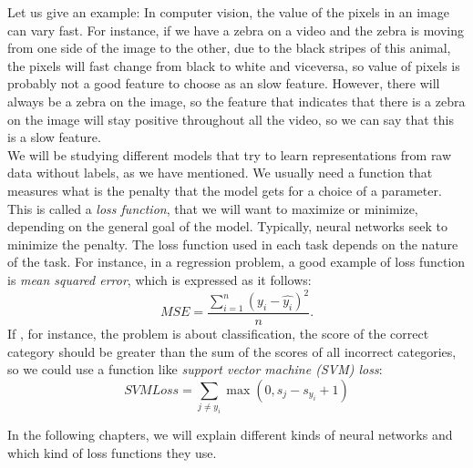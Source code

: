 
Let us give an example: In computer vision, the value of the pixels in an image can vary fast. For instance, if we have a zebra on a video and the zebra is moving from one side of the image to the other, due 
to the black stripes of this animal, the pixels will fast change from black to white and viceversa, so value of pixels is probably not a good feature to choose as an slow feature. However, there will always
be a zebra on the image, so the feature that indicates that there is a zebra on the image will stay positive throughout all the video, so we can say that this is a slow feature.\\

We will be studying different models that try to learn representations from raw data without labels, as we have mentioned. We usually need a function that measures what is the penalty that the model gets for a choice of a parameter.
This is called a \emph{loss function}, that we will want to maximize or minimize, depending on the general goal of the model. Typically, neural networks seek to minimize the penalty. The loss function used in each task depends on the nature of the task.
For instance, in a regression problem, a good example of loss function is \emph{mean squared error}, which is expressed as it follows:
\[
MSE = \frac{\sum_{i =1 }^n \left(y_i - \hat{y_i}\right)^2}{n}.
\]
If , for instance, the problem is about classification, the score of the correct category should be greater than the sum of the scores of all incorrect categories, so we could use a function like \emph{support vector machine (SVM) loss}:
\[
SVMLoss = \sum_{j \neq y_i} \max(0,s_j - s_{y_i} + 1)
\]



In the following chapters, we will explain different kinds of neural networks and which kind of loss functions they use. 


